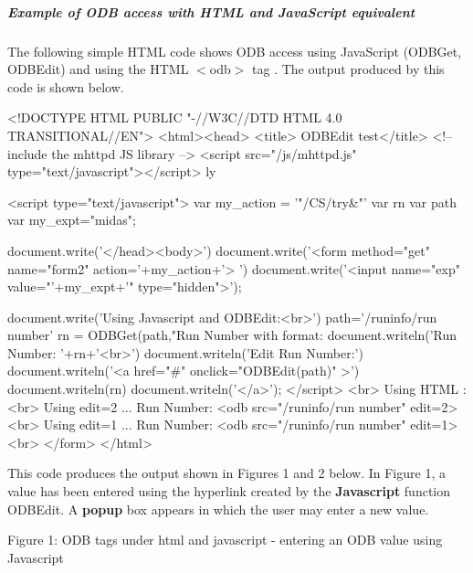\par
 \hypertarget{RC_mhttpd_custom_ODB_access_examples_RC_mhttpd_js_example1}{}\subparagraph{Example of ODB access with HTML and JavaScript equivalent}\label{RC_mhttpd_custom_ODB_access_examples_RC_mhttpd_js_example1}
The following simple HTML code shows ODB access using JavaScript (ODBGet, ODBEdit) and using the HTML  $<$odb$>$ tag . The output produced by this code is shown below. 
\begin{DoxyCode}
<!DOCTYPE HTML PUBLIC "-//W3C//DTD HTML 4.0 TRANSITIONAL//EN">
<html><head>
<title> ODBEdit test</title>
<!-- include the mhttpd JS library -->
\htmlonly <script src="/js/mhttpd.js" type="text/javascript"></script> \endhtmlon
      ly

\htmlonly <script type="text/javascript">
var my_action = '"/CS/try&"'
var rn
var path
var my_expt="midas";

document.write('</head><body>')
document.write('<form method="get" name="form2" action='+my_action+'> ')
document.write('<input name="exp" value="'+my_expt+'" type="hidden">');

document.write('Using Javascript and ODBEdit:<br>')
path='/runinfo/run number'
rn = ODBGet(path,"Run Number with format: %
document.writeln('Run Number: '+rn+'<br>')
document.writeln('Edit Run Number:')
document.writeln('<a href="#" onclick="ODBEdit(path)" >')
document.writeln(rn)
document.writeln('</a>');
</script> \endhtmlonly
<br>
Using HTML :
<br>
Using edit=2 ...  Run Number:
<odb src="/runinfo/run number" edit=2>
<br>
Using edit=1 ...  Run Number:
<odb src="/runinfo/run number" edit=1>
<br>
</form>
</html>
\end{DoxyCode}
 \par


This code produces the output shown in Figures 1 and 2 below. In Figure 1, a value has been entered using the hyperlink created by the {\bfseries Javascript} function ODBEdit. A {\bfseries popup} box appears in which the user may enter a new value.

\par
\par
\par
 \begin{center} Figure 1: ODB tags under html and javascript -\/ entering an ODB value using Javascript \par
\par
\par
  \end{center}  \par
\par
\par



